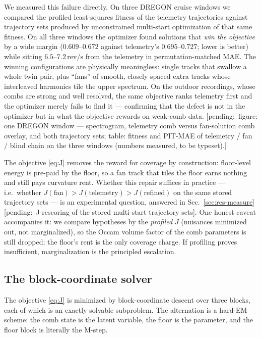 \documentclass[journal]{IEEEtran}
\newcommand{\revps}{\ensuremath{\,\mathrm{rev/s}}}
\newcommand{\Jobj}{\ensuremath{J}}
\newcommand{\pending}[1]{{\color{gray}\textsf{[pending:~#1]}}}
\begin{document}
We measured this failure directly. On three DREGON cruise windows we
compared the profiled least-squares fitness of the telemetry trajectories
against trajectory sets produced by unconstrained multi-start
optimization of that same fitness. On all three windows the optimizer
found solutions that \emph{win the objective} by a wide margin
($0.609$--$0.672$ against telemetry's $0.695$--$0.727$; lower is better)
while sitting $6.5$--$7.2\revps$ from the telemetry in
permutation-matched MAE. The winning configurations are physically
meaningless: single tracks that swallow a whole twin pair, plus ``fans''
of smooth, closely spaced extra tracks whose interleaved harmonics tile
the upper spectrum. On the outdoor recordings, whose combs are strong
and well resolved, the same objective ranks telemetry first and the
optimizer merely fails to find it --- confirming that the defect is not
in the optimizer but in what the objective rewards on weak-comb data.
\pending{figure: one DREGON window --- spectrogram, telemetry comb
versus fan-solution comb overlay, and both trajectory sets; table:
fitness and PIT-MAE of telemetry / fan / blind chain on the three
windows (numbers measured, to be typeset).}

The objective \eqref{eq:J} removes the reward for coverage by
construction: floor-level energy is pre-paid by the floor, so a fan
track that tiles the floor earns nothing and still pays curvature rent.
Whether this repair suffices in practice --- i.e.\ whether
$\Jobj(\text{fan}) > \Jobj(\text{telemetry}) > \Jobj(\text{refined})$
on the same stored trajectory sets --- is an experimental question,
answered in Sec.~\ref{sec:res-measure}
\pending{J-rescoring of the stored multi-start trajectory sets}. One
honest caveat accompanies it: we compare hypotheses by the
\emph{profiled} $\Jobj$ (nuisances minimized out, not marginalized), so
the Occam volume factor of the comb parameters is still dropped; the
floor's rent is the only coverage charge. If profiling proves
insufficient, marginalization is the principled escalation.

\subsection{The block-coordinate solver}
\label{sec:solver}

The objective \eqref{eq:J} is minimized by block-coordinate descent over
three blocks, each of which is an exactly solvable subproblem. The
alternation is a hard-EM scheme: the comb state is the latent variable,
the floor is the parameter, and the floor block is literally the M-step.
\end{document}
